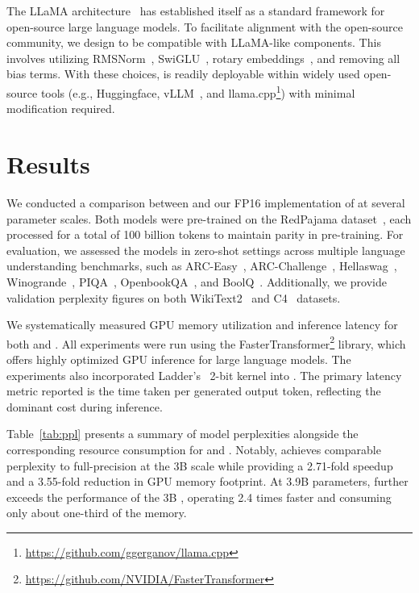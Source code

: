 The LLaMA architecture~\cite{llama, llama2} has established itself as a standard framework for open-source large language models. To facilitate alignment with the open-source community, we design  to be compatible with LLaMA-like components. This involves utilizing RMSNorm~\cite{rmsnorm}, SwiGLU~\cite{swiglu}, rotary embeddings~\cite{rope}, and removing all bias terms. With these choices,  is readily deployable within widely used open-source tools (e.g., Huggingface, vLLM~\cite{vllm}, and llama.cpp\footnote{\url{https://github.com/ggerganov/llama.cpp}}) with minimal modification required.

\section{Results}

We conducted a comparison between  and our FP16 implementation of  at several parameter scales. Both models were pre-trained on the RedPajama dataset~\cite{redpajama}, each processed for a total of 100 billion tokens to maintain parity in pre-training. For evaluation, we assessed the models in zero-shot settings across multiple language understanding benchmarks, such as ARC-Easy~\cite{arc}, ARC-Challenge~\cite{arc}, Hellaswag~\cite{hellaswag}, Winogrande~\cite{winoGrande}, PIQA~\cite{piqa}, OpenbookQA~\cite{openbookqa}, and BoolQ~\cite{boolq}. Additionally, we provide validation perplexity figures on both WikiText2~\cite{wikitext2} and C4~\cite{c4} datasets.

We systematically measured GPU memory utilization and inference latency for both  and . All experiments were run using the FasterTransformer\footnote{\url{https://github.com/NVIDIA/FasterTransformer}} library, which offers highly optimized GPU inference for large language models. The experiments also incorporated Ladder's~\cite{ladder} 2-bit kernel into . The primary latency metric reported is the time taken per generated output token, reflecting the dominant cost during inference.

Table~\ref{tab:ppl} presents a summary of model perplexities alongside the corresponding resource consumption for  and . Notably,  achieves comparable perplexity to full-precision  at the 3B scale while providing a 2.71-fold speedup and a 3.55-fold reduction in GPU memory footprint. At 3.9B parameters,  further exceeds the performance of the 3B , operating 2.4 times faster and consuming only about one-third of the memory.

